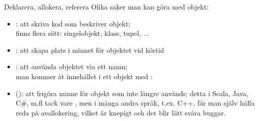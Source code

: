 \begin{Slide}{Deklarera, allokera, referera}
Olika saker man kan göra med objekt:
\begin{itemize}
  \item {}: att skriva kod som beskriver objekt; \\
  finns flera sätt: singelobjekt, klass, tupel, ...
  \item {}: att skapa plats i minnet för objektet vid körtid
  \item {}: att använda objektet via ett namn;\\
  man kommer åt innehållet i ett objekt med : \\
  \pause
  \item (): att frigöra minne för objekt som inte längre används;
  detta  i Scala, Java, C\#, m.fl tack vare , men i många andra språk,
  t.ex. C++, får man själv hålla reda på avallokering,
  vilket är knepigt och det blir lätt svåra buggar.
\end{itemize}
\end{Slide}


